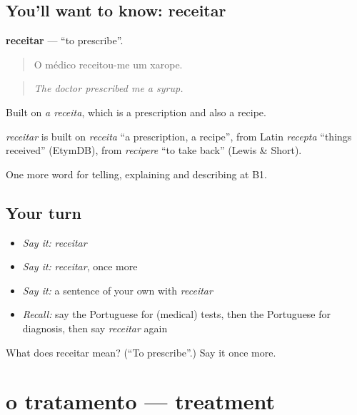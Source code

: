 \subsection*{You'll want to know: receitar}
\textbf{receitar} — \textquotedblleft{}to prescribe\textquotedblright{}.

\begin{quote}
O médico receitou-me um xarope.
\end{quote}

\begin{quote}
\emph{The doctor prescribed me a syrup.}
\end{quote}

Built on \emph{a receita}, which is a prescription and also a recipe.

\begin{cousinweb}
\emph{receitar} is built on \emph{receita} \textquotedblleft{}a prescription, a recipe\textquotedblright{}, from Latin \emph{recepta} \textquotedblleft{}things received\textquotedblright{} (EtymDB), from \emph{recipere} \textquotedblleft{}to take back\textquotedblright{} (Lewis \& Short).
\end{cousinweb}

\begin{grammarlens}[title={What you've built}]
One more word for telling, explaining and describing at B1.
\end{grammarlens}

\subsection*{Your turn}
\begin{itemize}
\raggedright
  \item \emph{Say it:} \emph{receitar}
  \item \emph{Say it:} \emph{receitar}, once more
  \item \emph{Say it:} a sentence of your own with \emph{receitar}
  \item \emph{Recall:} say the Portuguese for (medical) tests, then the Portuguese for diagnosis, then say \emph{receitar} again
\end{itemize}

\begin{tcolorbox}[breakable,colback=teal!4,colframe=teal!35!black,title={Before you move on}]
What does receitar mean? (\textquotedblleft{}To prescribe\textquotedblright{}.) Say it once more.
\end{tcolorbox}
\section[o tratamento]{o tratamento — treatment}

